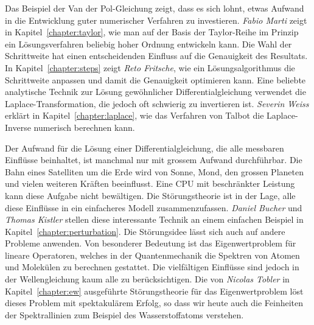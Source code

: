 Das Beispiel der Van der Pol-Gleichung zeigt, dass es sich lohnt,
etwas Aufwand in die Entwicklung guter numerischer Verfahren zu
investieren.
%
{\em Fabio Marti} zeigt in Kapitel~\ref{chapter:taylor}, wie man auf der
Basis der Taylor-Reihe im Prinzip ein Lösungsverfahren beliebig hoher Ordnung 
entwickeln kann.
%
%
Die Wahl der Schrittweite hat einen entscheidenden Einfluss auf die
Genauigkeit des Resultats.
%
In Kapitel~\ref{chapter:steps} zeigt
{\em Reto Fritsche}, wie ein Lösungsalgorithmus die Schrittweite
anpassen und damit die Genauigkeit optimieren kann.
%
Eine beliebte analytische Technik zur Lösung gewöhnlicher Differentialgleichung
verwendet die Laplace-Transformation, die jedoch oft schwierig zu
invertieren ist.
%
%
{\em Severin Weiss} erklärt in Kapitel~\ref{chapter:laplace}, wie 
das Verfahren von Talbot die Laplace-Inverse numerisch berechnen kann.
%

Der Aufwand für die Lösung einer Differentialgleichung, die alle
messbaren Einflüsse beinhaltet, ist manchmal nur mit grossem Aufwand
durchführbar.
Die Bahn eines Satelliten um die Erde wird von Sonne, Mond, den grossen
Planeten und vielen weiteren Kräften beeinflusst.
%
Eine CPU mit beschränkter Leistung kann diese Aufgabe nicht bewältigen.
Die Störungstheorie ist in der Lage, alle diese Einflüsse in ein einfacheres
Modell zusammenzufassen.
%
{\em Daniel Bucher} und {\em Thomas Kistler} stellen diese interessante
Technik an einem einfachen Beispiel in Kapitel~\ref{chapter:perturbation}.
%
%
Die Störungsidee lässt sich auch auf andere Probleme anwenden.
Von besonderer Bedeutung ist das Eigenwertproblem für lineare Operatoren,
welches in der Quantenmechanik die Spektren von Atomen und Molekülen
zu berechnen gestattet.
%
%
%
%
Die vielfältigen Einflüsse sind jedoch in der Wellengleichung kaum
alle zu berücksichtigen.
%
Die von {\em Nicolas Tobler} in Kapitel~\ref{chapter:ew} ausgeführte
Störungstheorie für das Eigenwertproblem löst dieses Problem mit
spektakulärem Erfolg, so dass wir heute auch die Feinheiten der
Spektrallinien zum Beispiel des Wasserstoffatoms verstehen.
%
%

